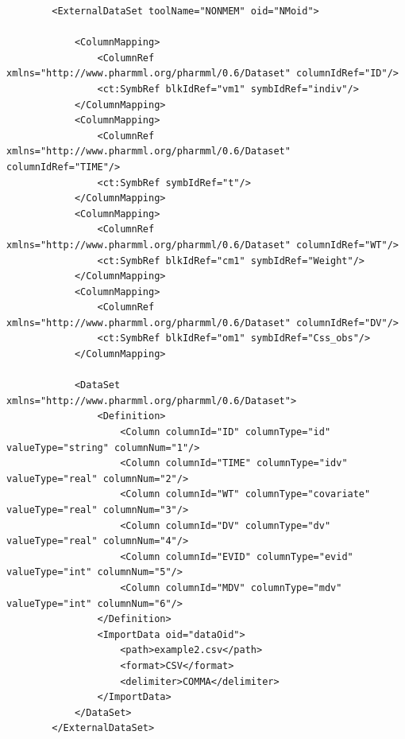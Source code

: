 \begin{lstlisting}
        <ExternalDataSet toolName="NONMEM" oid="NMoid">
            
            <ColumnMapping>
                <ColumnRef xmlns="http://www.pharmml.org/pharmml/0.6/Dataset" columnIdRef="ID"/>
                <ct:SymbRef blkIdRef="vm1" symbIdRef="indiv"/>
            </ColumnMapping>
            <ColumnMapping>
                <ColumnRef xmlns="http://www.pharmml.org/pharmml/0.6/Dataset" columnIdRef="TIME"/>
                <ct:SymbRef symbIdRef="t"/>
            </ColumnMapping>
            <ColumnMapping>
                <ColumnRef xmlns="http://www.pharmml.org/pharmml/0.6/Dataset" columnIdRef="WT"/>
                <ct:SymbRef blkIdRef="cm1" symbIdRef="Weight"/>
            </ColumnMapping>            
            <ColumnMapping>
                <ColumnRef xmlns="http://www.pharmml.org/pharmml/0.6/Dataset" columnIdRef="DV"/>
                <ct:SymbRef blkIdRef="om1" symbIdRef="Css_obs"/>
            </ColumnMapping>
            
            <DataSet xmlns="http://www.pharmml.org/pharmml/0.6/Dataset">
                <Definition>
                    <Column columnId="ID" columnType="id" valueType="string" columnNum="1"/>
                    <Column columnId="TIME" columnType="idv" valueType="real" columnNum="2"/>
                    <Column columnId="WT" columnType="covariate" valueType="real" columnNum="3"/>
                    <Column columnId="DV" columnType="dv" valueType="real" columnNum="4"/>
                    <Column columnId="EVID" columnType="evid" valueType="int" columnNum="5"/>
                    <Column columnId="MDV" columnType="mdv" valueType="int" columnNum="6"/>
                </Definition>
                <ImportData oid="dataOid">
                    <path>example2.csv</path>
                    <format>CSV</format>
                    <delimiter>COMMA</delimiter>
                </ImportData>
            </DataSet>
        </ExternalDataSet>
\end{lstlisting}
        
